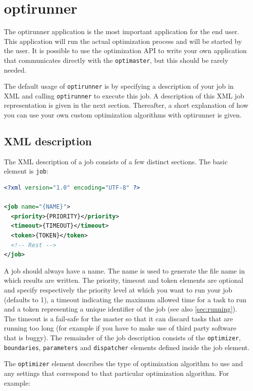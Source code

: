 \documentclass{report}
\begin{document}
\section{optirunner}\label{app:optirunner}
The optirunner application is the most important application for the end user.
This application will run the actual optimization process and will be started
by the user. It is possible to use the optimization API to write your own
application that communicates directly with the \verb!optimaster!, but this
should be rarely needed.

The default usage of \verb!optirunner! is by specifying a description of your job
in XML and calling \verb!optirunner! to execute this job. A description of
this XML job representation is given in the next section. Thereafter, a short
explanation of how you can use your own custom optimization algorithms with
optirunner is given.

\subsection{XML description}
The XML description of a job consists of a few distinct sections. The basic
element is \verb!job!:

\begin{lstlisting}[language=xml]
<?xml version="1.0" encoding="UTF-8" ?>

<job name="{NAME}">
  <priority>{PRIORITY}</priority>
  <timeout>{TIMEOUT}</timeout>
  <token>{TOKEN}</token>
  <!-- Rest -->
</job>
\end{lstlisting}

A job should always have a name. The name is used to generate the file name
in which results are written. The priority, timeout and token elements are optional
and specify respectively the priority level at which you want to run your job
(defaults to 1), a timeout indicating the maximum allowed time for a task
to run and a token representing a unique identifier of the job (see also \ref{sec:running}).
The timeout is a fail-safe for the master so that it can discard tasks
that are running too long (for example if you have to make use of third party
software that is buggy). The remainder of the job description consists of
the \verb!optimizer!, \verb!boundaries!, \verb!parameters! and \verb!dispatcher!
elements defined inside the job element.

The \verb!optimizer! element describes the type of optimization algorithm to
use and any settings that correspond to that particular optimization algorithm.
For example:
\end{document}
